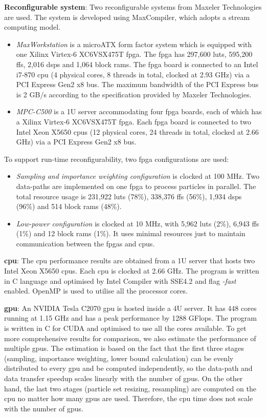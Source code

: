 \textbf{Reconfigurable system}: Two reconfigurable systems from Maxeler Technologies are used.
The system is developed using MaxCompiler, which adopts a stream computing model.
\begin{itemize}
\item \textit{MaxWorkstation} is a microATX form factor system which is equipped with one Xilinx Virtex-6 XC6VSX475T \gls{fpga}.
The \gls{fpga} has 297,600 \glspl{lut}, 595,200 \glspl{ff}, 2,016 \glspl{dsp} and 1,064 block \glspl{ram}. 
The \gls{fpga} board is connected to an Intel i7-870 \gls{cpu} (4 physical cores, 8 threads in total, clocked at 2.93 GHz) via a PCI Express Gen2 x8 bus.
The maximum bandwidth of the PCI Express bus is 2 GB/s according to the specification provided by Maxeler Technologies.
\item \textit{MPC-C500} is a 1U server accommodating four \gls{fpga} boards, each of which has a Xilinx Virtex-6 XC6VSX475T \gls{fpga}.
Each \gls{fpga} board is connected to two Intel Xeon X5650 \glspl{cpu} (12 physical cores, 24 threads in total, clocked at 2.66 GHz) via a PCI Express Gen2 x8 bus.
\end{itemize}

To support run-time reconfigurability, two \gls{fpga} configurations are used:
\begin{itemize}
\item {\it Sampling and importance weighting configuration} is clocked at 100 MHz.
Two data-paths are implemented on one \gls{fpga} to process particles in parallel.
The total resource usage is 231,922 \glspl{lut} (78\%), 338,376 \glspl{ff} (56\%), 1,934 \glspl{dsp} (96\%) and 514 block \glspl{ram} (48\%).
\item {\it Low-power configuration} is clocked at 10 MHz, with 5,962 \glspl{lut} (2\%), 6,943 \glspl{ff} (1\%) and 12 block \glspl{ram} (1\%).
It uses minimal resources just to maintain communication between the \glspl{fpga} and \glspl{cpu}.
\end{itemize}

\textbf{\gls{cpu}}: The \gls{cpu} performance results are obtained from a 1U server that hosts two Intel Xeon X5650 \glspl{cpu}. 
Each \gls{cpu} is clocked at 2.66 GHz.
The program is written in C language and optimised by Intel Compiler with SSE4.2 and flag {\it -fast} enabled.
OpenMP is used to utilise all the processor cores.

\textbf{\gls{gpu}}: An NVIDIA Tesla C2070 \gls{gpu} is hosted inside a 4U server.
It has 448 cores running at 1.15 GHz and has a peak performance by 1288 GFlops.
The program is written in C for CUDA and optimised to use all the cores available.
To get more comprehensive results for comparison, we also estimate the performance of multiple \gls{gpu}s.
The estimation is based on the fact that the first three stages (sampling, importance weighting, lower bound calculation) can be evenly distributed to every \gls{gpu} and be computed independently, 
so the data-path and data transfer speedup scales linearly with the number of \gls{gpu}s.
On the other hand, the last two stages (particle set resizing, resampling) are computed on the \gls{cpu} no matter how many \gls{gpu}s are used.
Therefore, the \gls{cpu} time does not scale with the number of \gls{gpu}s.

